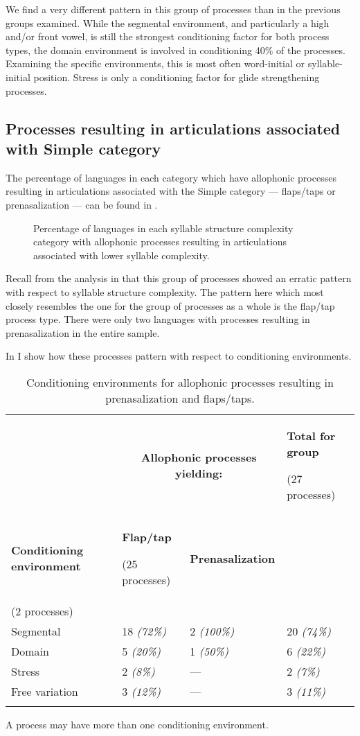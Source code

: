   We find a very different pattern in this group of processes than in the previous groups examined. While the segmental environment, and particularly a high and/or front vowel, is still the strongest conditioning factor for both process types, the domain environment is involved in conditioning 40\% of the processes. Examining the specific environments, this is most often word-initial or syllable-initial position. Stress is only a conditioning factor for glide strengthening processes.

\subsection{Processes resulting in articulations associated with Simple category}\label{sec:7.3.5}

  The percentage of languages in each category which have allophonic processes resulting in articulations associated with the Simple category — flaps/taps or prenasalization — can be found in .

\begin{figure}
\caption{\label{fig:7.9} Percentage of languages in each syllable structure complexity category with allophonic processes resulting in articulations associated with lower syllable complexity.}
\end{figure}

  Recall from the analysis in  that this group of processes showed an erratic pattern with respect to syllable structure complexity. The pattern here which most closely resembles the one for the group of processes as a whole is the flap/tap process type. There were only two languages with processes resulting in prenasalization in the entire sample.

  In  I show how these processes pattern with respect to conditioning environments.

\begin{table}
\begin{tabularx}{\textwidth}{XXXX}
\lsptoprule
 & \multicolumn{2}{c}{ \textbf{Allophonic processes yielding:}} & { \textbf{Total for group}}

 (27 processes)\\
 \textbf{Conditioning environment} & { \textbf{Flap/tap}}

 (25 processes) & \textbf{Prenasalization}\\
(2 processes) & \\
 Segmental & 18 \textit{(72\%)} & 2 \textit{(100\%)} & 20 \textit{(74\%)}\\
 Domain & 5 \textit{(20\%)} & 1 \textit{(50\%)} & 6 \textit{(22\%)}\\
 Stress & 2 \textit{(8\%)} & — & 2 \textit{(7\%)}\\
 Free variation & 3 \textit{(12\%)} & — & 3 \textit{(11\%)}\\
\lspbottomrule
\end{tabularx}
\caption{\label{tab:7.5}Conditioning environments for allophonic processes resulting in prenasalization and flaps/taps.}A process may have more than one conditioning environment.
\end{table}

